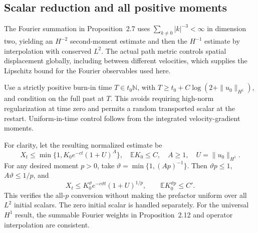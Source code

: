 \documentclass[10pt]{article}
\begin{document}
\subsection*{Scalar reduction and all positive moments}
The Fourier summation in Proposition 2.7 uses \(\sum_{k\ne0}|k|^{-3}<\infty\) in dimension two, yielding an \(H^{-2}\) second-moment estimate and then the \(H^{-1}\) estimate by interpolation with conserved \(L^2\). The actual path metric controls spatial displacement globally, including between different velocities, which supplies the Lipschitz bound for the Fourier observables used here.\par
Use a strictly positive burn-in time \(T\in t_0\mathbb N\), with \(T\ge t_0+C\log(2+\|u_0\|_{H^1})\), and condition on the full past at \(T\). This avoids requiring high-norm regularization at time zero and permits a random transported scalar at the restart. Uniform-in-time control follows from the integrated velocity-gradient moments.\par
For clarity, let the resulting normalized estimate be \[X_t\le\min\{1,K_0e^{-ct}(1+U)^A\},
 \quad \mathbb EK_0\le C,\quad A\ge1,\quad U=\|u_0\|_{H^1}.\] For any desired moment \(p>0\), take \(\vartheta=\min\{1,(Ap)^{-1}\}\). Then \(\vartheta p\le1\), \(A\vartheta\le1/p\), and \[X_t\le K_0^\vartheta e^{-c\vartheta t}(1+U)^{1/p},
 \qquad \mathbb E K_0^{\vartheta p}\le C'.\] This verifies the all-\(p\) conversion without making the prefactor uniform over all \(L^2\) initial scalars. The zero initial scalar is handled separately. For the universal \(H^1\) result, the summable Fourier weights in Proposition 2.12 and operator interpolation are consistent.\par
\end{document}
